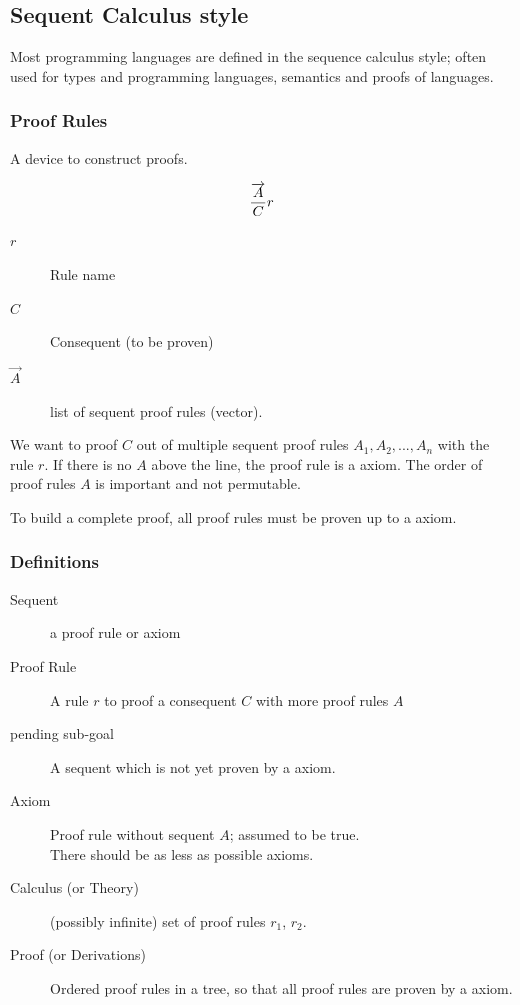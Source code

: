 \subsection{Sequent Calculus style}

Most programming languages are defined in the sequence calculus style; often used for types and programming languages, semantics and proofs of languages.


\subsubsection{Proof Rules}

 A device to construct proofs.
 
 \[
 \frac{\overrightarrow{A}}{C} \boldmath{r}
 \]
 
 \begin{description}
	 	\item[$r$] Rule name
	 	\item[$C$] Consequent (to be proven)
	 	\item[$\vec{A}$] list of sequent proof rules (vector).
 	\end{description}
 	
 
 We want to proof $C$ out of multiple sequent proof rules $A_1, A_2, ..., A_n$ with the rule $r$. If there is no $A$ above the line, the proof rule is a axiom. The order of proof rules $A$ is important and not permutable.
 
 To build a complete proof, all proof rules must be proven up to a axiom.


\subsubsection{Definitions}

\begin{description}
	\item[Sequent] a proof rule or axiom
	\item[Proof Rule] A rule $r$ to proof a consequent $C$ with more proof rules $A$
	\item[pending sub-goal] A sequent which is not yet proven by a axiom.
	\item[Axiom] Proof rule without sequent $A$; assumed to be true. \\
	There should be as less as possible axioms.
	\item[Calculus (or Theory)] (possibly infinite) set of proof rules $r_1$, $r_2$.
	\item[Proof (or Derivations)] Ordered proof rules in a tree, so that all proof rules are proven by a axiom.
\end{description}

